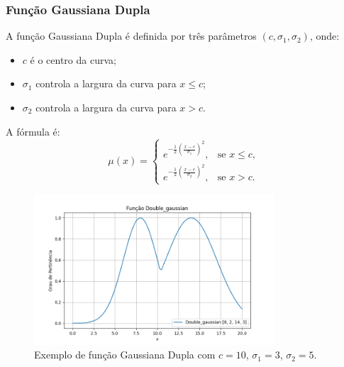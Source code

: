 \documentclass[a4paper,12pt]{article}
\begin{document}
\subsubsection{Função Gaussiana Dupla}
A função Gaussiana Dupla é definida por três parâmetros $(c, \sigma_1, \sigma_2)$, onde:
\begin{itemize}
    \item $c$ é o centro da curva;
    \item $\sigma_1$ controla a largura da curva para $x \leq c$;
    \item $\sigma_2$ controla a largura da curva para $x > c$.
\end{itemize}
A fórmula é:
\[
\mu(x) =
\begin{cases}
e^{-\frac{1}{2} \left( \frac{x - c}{\sigma_1} \right)^2}, & \text{se } x \leq c, \\
e^{-\frac{1}{2} \left( \frac{x - c}{\sigma_2} \right)^2}, & \text{se } x > c.
\end{cases}
\]
\begin{figure}[H]
    \centering
    \includegraphics[width=0.8\textwidth]{img/double_gaussian.png}
    \caption{Exemplo de função Gaussiana Dupla com $c=10$, $\sigma_1=3$, $\sigma_2=5$.}
\end{figure}
\end{document}
